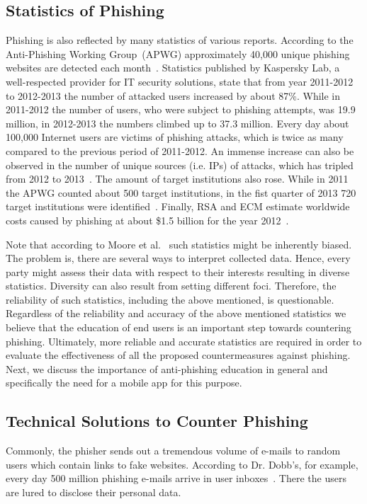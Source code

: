 \subsection{Statistics of Phishing}
\label{s:stats}
Phishing is also reflected by many statistics of various reports. 
 According to the Anti-Phishing Working Group~(APWG) approximately 40,000 unique phishing websites are detected each month~\cite{antiphishingtrendreport2013}. Statistics published by Kaspersky Lab, a well-respected provider for IT security solutions, state that from year 2011-2012 to 2012-2013 the number of attacked users increased by about 87\%. While in 2011-2012 the number of users, who were subject to phishing attempts, was 19.9 million, in 2012-2013 the numbers climbed up to 37.3 million. 
 Every day about 100,000 Internet users are victims of phishing attacks, which is twice as many compared to the previous period of 2011-2012. An immense increase can also be observed in the number of unique sources (i.e. IPs) of attacks, which has tripled from 2012 to 2013~\cite{kasperskyreport2013}. The amount of target institutions also rose. 
 While in 2011 the APWG counted about 500 target institutions, in the fist quarter of 2013 720 target institutions were identified~\cite{antiphishingglobalreport2013}. 
Finally, RSA and ECM estimate worldwide costs caused by phishing at about \$1.5 billion for the year 2012~\cite{rsa2013}. 

Note that according to Moore et al.~\cite{moore2010hard} such statistics might be inherently biased. 
The problem is, there are several ways to interpret collected data. 
Hence, every party might assess their data with respect to their interests resulting in diverse statistics. 
Diversity can also result from setting different foci.
Therefore, the reliability of such statistics, including the above mentioned, is questionable. 
Regardless of the reliability and accuracy of the above mentioned statistics we believe that the education of end users is an important step towards countering phishing. 
Ultimately, more reliable and accurate statistics are required in order to evaluate the effectiveness of all the proposed countermeasures against phishing. 
Next, we discuss the importance of anti-phishing education in general and specifically the need for a mobile app for this purpose.
\subsection{Technical Solutions to Counter Phishing}
\label{s:technical_solutions}
Commonly, the phisher sends out a tremendous volume of e-mails to random users which contain links to fake websites.
According to Dr. Dobb's, for example, every day 500 million phishing e-mails arrive in user inboxes~\cite{drdobb2012email}.
 There the users are lured to disclose their personal data.

